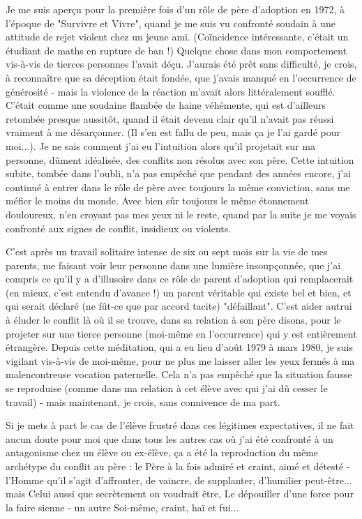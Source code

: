 Je me suis aperçu pour la première fois d'un rôle de père d'adoption en 1972, à l'époque de "Survivre et Vivre", quand je me suis vu confronté soudain à une attitude de rejet violent chez un jeune ami. (Coïncidence intéressante, c'était un étudiant de maths en rupture de ban !) Quelque chose dans mon comportement vis-à-vis de tierces personnes l'avait déçu. J'aurais été prêt sans difficulté, je crois, à reconnaître que sa déception était fondée, que j'avais manqué en l'occurrence de générosité - mais la violence de la réaction m'avait alors littéralement soufflé. C'était comme une soudaine flambée de haine véhémente, qui est d'ailleurs retombée presque aussitôt, quand il était devenu clair qu'il n'avait pas réussi vraiment à me désarçonner. (Il s'en est fallu de peu, mais ça je l'ai gardé pour moi...). Je ne sais comment j'ai eu l'intuition alors qu'il projetait sur ma personne, dûment idéalisée, des conflits non résolus avec son père. Cette intuition subite, tombée dans l'oubli, n'a pas empêché que pendant des années encore, j'ai continué à entrer dans le rôle de père avec toujours la même conviction, sans me méfier le moins du monde. Avec bien sûr toujours le même étonnement douloureux, n'en croyant pas mes yeux ni le reste, quand par la suite je me voyais confronté aux signes de conflit, insidieux ou violents.

C'est après un travail solitaire intense de six ou sept mois sur la vie de mes parents, me faisant voir leur personne dans une lumière insoupçonnée, que j'ai compris ce qu'il y a d'illusoire dans ce rôle de parent d'adoption qui remplacerait (en mieux, c'est entendu d'avance !) un parent véritable qui existe bel et bien, et qui serait déclaré (ne fût-ce que par accord tacite) "défaillant". C’est aider autrui à éluder le conflit là où il se trouve, dans sa relation à son père disons, pour le projeter sur une tierce personne (moi-même en l'occurrence) qui y est entièrement étrangère. Depuis cette méditation, qui a eu lieu d'août 1979 à mars 1980, je suis vigilant vis-à-vis de moi-même, pour ne plus me laisser aller les yeux fermés à ma malencontreuse vocation paternelle. Cela n'a pas empêché que la situation fausse se reproduise (comme dans ma relation à cet élève avec qui j'ai dû cesser le travail) - mais maintenant, je crois, sans connivence de ma part.

Si je mets à part le cas de l'élève frustré dans ces légitimes expectatives, il ne fait aucun doute pour moi que dans tous les autres cas où j'ai été confronté à un antagonisme chez un élève ou ex-élève, ça a été la reproduction du même archétype du conflit au père : le Père à la fois admiré et craint, aimé et détesté - l'Homme qu'il s'agit d'affronter, de vaincre, de supplanter, d'humilier peut-être... mais Celui aussi que secrètement on voudrait être, Le dépouiller d'une force pour la faire sienne - un autre Soi-même, craint, haï et fui...



